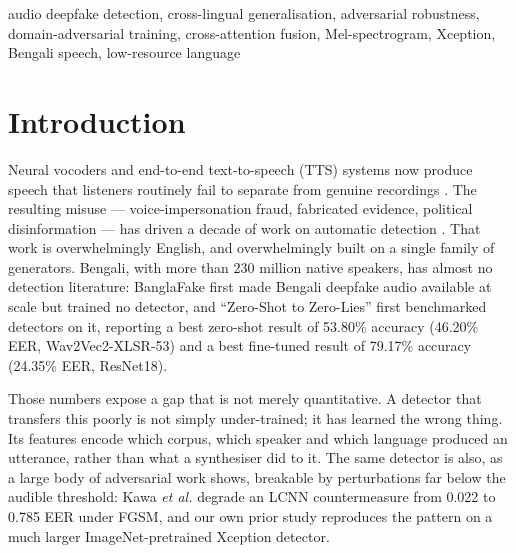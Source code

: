 \documentclass[conference]{IEEEtran}
\renewcommand{\cite}[1]{\unskip}
\begin{document}
\begin{IEEEkeywords}
audio deepfake detection, cross-lingual generalisation, adversarial
robustness, domain-adversarial training, cross-attention fusion,
Mel-spectrogram, Xception, Bengali speech, low-resource language
\end{IEEEkeywords}

\section{Introduction}

Neural vocoders and end-to-end text-to-speech (TTS) systems now produce
speech that listeners routinely fail to separate from genuine recordings
\cite{kong2020hifigan,kumar2019melgan,prenger2019waveglow,yamamoto2020pwg,kim2021vits}.
The resulting misuse --- voice-impersonation fraud, fabricated evidence,
political disinformation --- has driven a decade of work on automatic
detection \cite{todisco2019asvspoof,frank2021wavefake}. That work is
overwhelmingly English, and overwhelmingly built on a single family of
generators. Bengali, with more than 230 million native speakers, has almost
no detection literature: BanglaFake \cite{fahad2025banglafake} first made
Bengali deepfake audio available at scale but trained no detector, and
``Zero-Shot to Zero-Lies'' \cite{samu2025zeroshot} first benchmarked
detectors on it, reporting a best zero-shot result of 53.80\% accuracy
(46.20\% EER, Wav2Vec2-XLSR-53) and a best fine-tuned result of 79.17\%
accuracy (24.35\% EER, ResNet18).

Those numbers expose a gap that is not merely quantitative. A detector that
transfers this poorly is not simply under-trained; it has learned the wrong
thing. Its features encode which corpus, which speaker and which language
produced an utterance, rather than what a synthesiser did to it. The same
detector is also, as a large body of adversarial work shows, breakable by
perturbations far below the audible threshold: Kawa \emph{et al.}
\cite{kawa2023lcnn} degrade an LCNN countermeasure from 0.022 to 0.785 EER
under FGSM, and our own prior study \cite{ahmed2026melspec} reproduces the
pattern on a much larger ImageNet-pretrained Xception detector.
\end{document}
